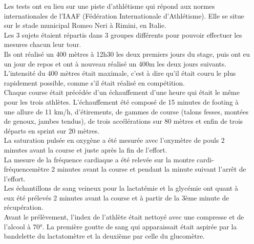             Les tests ont eu lieu sur une piste d'athlétisme qui répond aux normes internationales de l'IAAF (Fédération Internationale d'Athlétisme). Elle se situe sur le stade municipal Romeo Neri à Rimini, en Italie.\\
            
            Les 3 sujets étaient répartis dans 3 groupes différents pour pouvoir effectuer les mesures chacun leur tour.\\
            
            Ils ont réalisé un 400 mètres à 12h30 les deux premiers jours du stage, puis ont eu un jour de repos et ont à nouveau réalisé un 400m les deux jours suivants.\\

            L'intensité du 400 mètres était maximale, c'est à dire qu'il était couru le plus rapidement possible, comme s'il était réalisé en compétition. \\
            
            Chaque course était précédée d’un échauffement d’une heure qui était le même pour les trois athlètes. L'échauffement été composé de 15 minutes de footing à une allure de 11 km/h, d'étirements, de gammes de course (talons fesses, montées de genoux, jambes tendus), de trois accélérations sur 80 mètres et enfin de trois départs en sprint sur 20 mètres.\\
            
            La saturation pulsée en oxygène a été mesurée avec l'oxymètre de pouls 2 minutes avant la course et juste après la fin de l'effort.\\
            
            La mesure de la fréquence cardiaque a été relevée sur la montre cardi-fréquencemètre 2 minutes avant la course et pendant la minute suivant l'arrêt de l'effort.\\
            
            Les échantillons de sang veineux pour la lactatémie et la glycémie ont quant à eux été prélevés  2 minutes avant la course et à partir de la 3ème minute de récupération.\\
            
            Avant le prélèvement, l'index de l'athlète était nettoyé avec une compresse et de l'alcool à 70°. La première goutte de sang qui apparaissait était aspirée par la bandelette du lactatomètre et la deuxième par celle du glucomètre.\\
            

